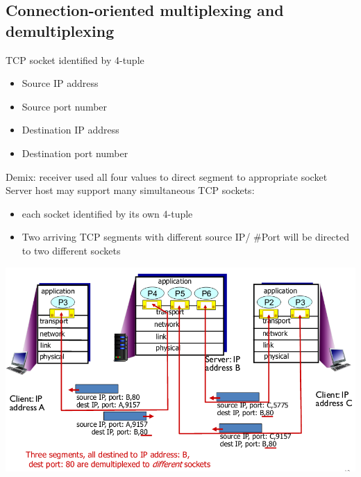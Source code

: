 \documentclass{article}[18pt]
\begin{document}
\subsection{Connection-oriented multiplexing and demultiplexing}
TCP socket identified by 4-tuple
\begin{itemize}
	\item Source IP address
	\item Source port number
	\item Destination IP address
	\item Destination port number
\end{itemize}
Demix: receiver used all four values to direct segment to appropriate socket\\
Server host may support many simultaneous TCP sockets:
\begin{itemize}
	\item each socket identified by its own 4-tuple
	\item Two arriving TCP segments with different source IP/ \#Port will be directed to two different sockets
\end{itemize}
\begin{center}
	\includegraphics[scale=0.7]{connection}
\end{center}
\end{document}
